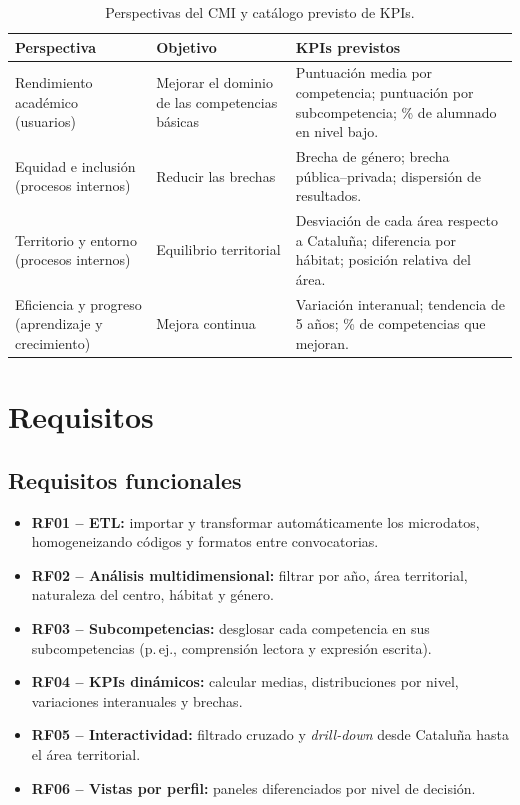 \documentclass[12pt, a4paper, oneside]{report}
\begin{document}
\begin{table}[H]
\centering
\small
\renewcommand{\arraystretch}{1.1}
\begin{tabularx}{\textwidth}{@{} p{3.4cm} p{3.6cm} X @{}}
\toprule
\textbf{Perspectiva} & \textbf{Objetivo} & \textbf{KPIs previstos} \\ \midrule
Rendimiento académico (usuarios) & Mejorar el dominio de las competencias básicas & Puntuación media por competencia; puntuación por subcompetencia; \% de alumnado en nivel bajo. \\ \addlinespace
Equidad e inclusión (procesos internos) & Reducir las brechas & Brecha de género; brecha pública--privada; dispersión de resultados. \\ \addlinespace
Territorio y entorno (procesos internos) & Equilibrio territorial & Desviación de cada área respecto a Cataluña; diferencia por hábitat; posición relativa del área. \\ \addlinespace
Eficiencia y progreso (aprendizaje y crecimiento) & Mejora continua & Variación interanual; tendencia de 5 años; \% de competencias que mejoran. \\ \bottomrule
\end{tabularx}
\caption{Perspectivas del CMI y catálogo previsto de KPIs.}
\label{tab:kpis}
\end{table}

\section{Requisitos}
\subsection{Requisitos funcionales}
\begin{itemize}
    \item \textbf{RF01 -- ETL:} importar y transformar automáticamente los microdatos, homogeneizando códigos y formatos entre convocatorias.
    \item \textbf{RF02 -- Análisis multidimensional:} filtrar por año, área territorial, naturaleza del centro, hábitat y género.
    \item \textbf{RF03 -- Subcompetencias:} desglosar cada competencia en sus subcompetencias (p.\,ej., comprensión lectora y expresión escrita).
    \item \textbf{RF04 -- KPIs dinámicos:} calcular medias, distribuciones por nivel, variaciones interanuales y brechas.
    \item \textbf{RF05 -- Interactividad:} filtrado cruzado y \textit{drill-down} desde Cataluña hasta el área territorial.
    \item \textbf{RF06 -- Vistas por perfil:} paneles diferenciados por nivel de decisión.
\end{itemize}
\end{document}
